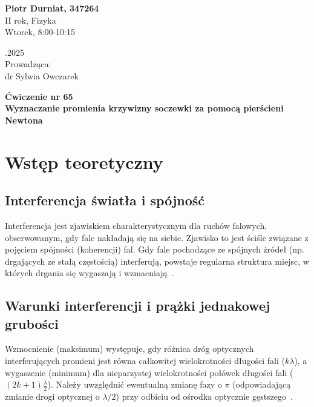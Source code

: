 \documentclass[a4paper,12pt]{article}
\begin{document}
\noindent
\begin{minipage}{0.5\textwidth}
    \raggedright
    \textbf{Piotr Durniat, 347264} \\
    II rok, Fizyka \\
    Wtorek, 8:00-10:15
    \vspace{0.5cm}
\end{minipage}
\begin{minipage}{0.5\textwidth}
    .2025 \\
    \vspace{0.5cm}
    Prowadząca: \\
    dr Sylwia Owczarek
\end{minipage}

\vspace{2cm}
\begin{center}
    \LARGE \textbf{Ćwiczenie nr 65} \\[0.5cm]
    \Large \textbf{Wyznaczanie promienia krzywizny soczewki za pomocą pierścieni Newtona}
\end{center}

\vspace{1cm} %
\noindent


\section{Wstęp teoretyczny}

\subsection*{Interferencja światła i spójność}
Interferencja jest zjawiskiem charakterystycznym dla ruchów falowych, obserwowanym, gdy fale nakładają się na siebie. Zjawisko to jest ściśle związane z pojęciem spójności (koherencji) fal. Gdy fale pochodzące ze spójnych źródeł (np. drgających ze stałą częstością) interferują, powstaje regularna struktura miejsc, w których drgania się wygaszają i wzmacniają~\citep{Drynski1976}.

\subsection*{Warunki interferencji i prążki jednakowej grubości}
Wzmocnienie (maksimum) występuje, gdy różnica dróg optycznych interferujących promieni jest równa całkowitej wielokrotności długości fali (\(k\lambda\)), a wygaszenie (minimum) dla nieparzystej wielokrotności połówek długości fali (\((2k+1)\frac{\lambda}{2}\)). Należy uwzględnić ewentualną zmianę fazy o \(\pi\) (odpowiadającą zmianie drogi optycznej o \(\lambda/2\)) przy odbiciu od ośrodka optycznie gęstszego~\citep{Drynski1976}.
\end{document}
